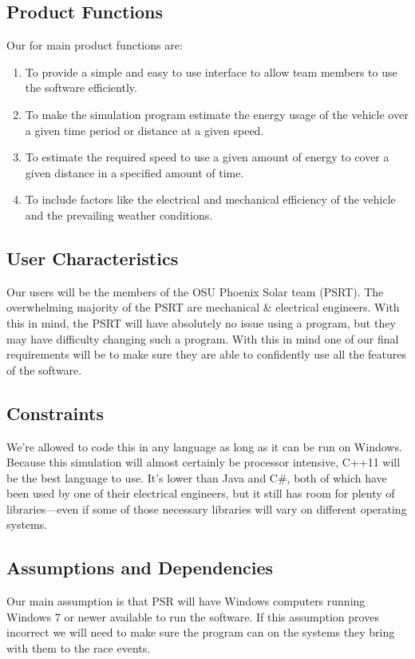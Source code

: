 \documentclass[onecolumn, draftclsnofoot,10pt, compsoc]{IEEEtran}
\begin{document}
    \subsection{Product Functions}          %
    Our for main product functions are: 
    \begin{enumerate}
        \item To provide a simple and easy to use interface to allow team members to use the software efficiently. 
        \item To make the simulation program estimate the energy usage of the vehicle over a given time period or distance at a given speed.
        \item To estimate the required speed to use a given amount of energy to cover a given distance in a specified amount of time. 
        \item To include factors like the electrical and mechanical efficiency of the vehicle and the prevailing weather conditions. 
    \end{enumerate}
    
    \subsection{User Characteristics}
    Our users will be the members of the OSU Phoenix Solar team (PSRT). The overwhelming majority of the PSRT are mechanical \& electrical engineers.
    With this in mind, the PSRT will have absolutely no issue using a program, but they may have difficulty changing such a program. 
    With this in mind one of our final requirements will be to make sure they are able to confidently use all the features of the software.
    
    \subsection{Constraints}
    We're allowed to code this in any language as long as it can be run on Windows. 
    Because this simulation will almost certainly be processor intensive, C++11 will be the best language to use.
    It's lower than Java and C\#, both of which have been used by one of their electrical engineers, but it still has room for plenty of libraries---even if some of those necessary libraries will vary on different operating systems.
    
    \subsection{Assumptions and Dependencies}
    Our main assumption is that PSR will have Windows computers running Windows 7 or newer available to run the software. If this assumption proves incorrect we will need to make sure the program can on the systems they bring with them to the race events.
    
\end{document}

